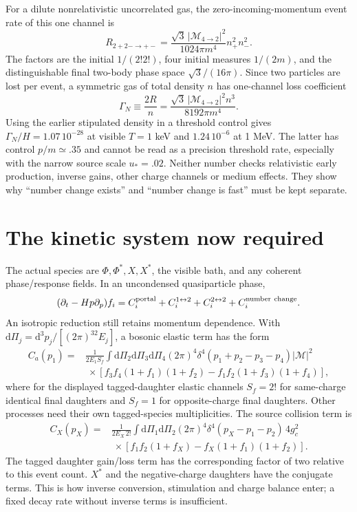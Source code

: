\documentclass[11pt]{article}
\newcommand{\dd}{\mathrm d}
\begin{document}
For a dilute nonrelativistic uncorrelated gas, the zero-incoming-momentum
event rate of this one channel is
\begin{equation}
 R_{2+2-\to+-}=\frac{\sqrt3\,|\mathcal M_{4\to2}|^2}
 {1024\pi m^4}n_+^2n_-^2.
\end{equation}
The factors are the initial $1/(2!2!)$, four initial measures $1/(2m)$,
and the distinguishable final two-body phase space $\sqrt3/(16\pi)$.
Since two particles are lost per event, a symmetric gas of total density
$n$ has one-channel loss coefficient
\begin{equation}
 \Gamma_N\equiv\frac{2R}{n}
 =\frac{\sqrt3\,|\mathcal M_{4\to2}|^2 n^3}{8192\pi m^4}.
\end{equation}
Using the earlier stipulated density in a threshold control gives
$\Gamma_N/H=1.07\,10^{-28}$ at visible $T=1$ keV and
$1.24\,10^{-6}$ at 1 MeV. The latter has control $p/m\simeq.35$ and
cannot be read as a precision threshold rate, especially with the narrow
source scale $u_*=.02$. Neither number checks relativistic early production,
inverse gains, other charge channels or medium effects. They show why
``number change exists'' and ``number change is fast'' must be kept separate.

\section{The kinetic system now required}
The actual species are $\Phi,\Phi^*,X,X^*$, the visible bath, and any
coherent phase/response fields. In an uncondensed quasiparticle phase,
\begin{equation}
 (\partial_t-Hp\partial_p)f_i=C_i^{\rm portal}
 +C_i^{1\leftrightarrow2}+C_i^{2\leftrightarrow2}
 +C_i^{\rm number\ change}.
\end{equation}
An isotropic reduction still retains momentum dependence. With
$\dd\Pi_j=\dd^3p_j/[(2\pi)^32E_j]$, a bosonic elastic term has the form
\begin{align}
 C_a(p_1)={}&\frac{1}{2E_1 S_f}\int\dd\Pi_2\dd\Pi_3\dd\Pi_4
 (2\pi)^4\delta^4(p_1+p_2-p_3-p_4)|\mathcal M|^2\\
 &\ \times[f_3f_4(1+f_1)(1+f_2)-f_1f_2(1+f_3)(1+f_4)],\nonumber
\end{align}
where for the displayed tagged-daughter elastic channels $S_f=2!$ for
same-charge identical final daughters and $S_f=1$ for opposite-charge
final daughters. Other processes need their own tagged-species multiplicities.
The source collision term is
\begin{align}
 C_X(p_X)={}&\frac{1}{2E_X\,2!}\int\dd\Pi_1\dd\Pi_2
 (2\pi)^4\delta^4(p_X-p_1-p_2)\,4g_c^2\\
 &\ \times[f_1f_2(1+f_X)-f_X(1+f_1)(1+f_2)].\nonumber
\end{align}
The tagged daughter gain/loss term has the corresponding factor of two
relative to this event count. $X^*$ and the negative-charge daughters have
the conjugate terms. This is how inverse conversion, stimulation and charge
balance enter; a fixed decay rate without inverse terms is insufficient.
\end{document}
